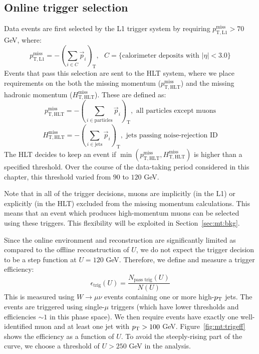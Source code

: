 \subsection{Online trigger selection}
\label{sec:mt:trigger}

Data events are first selected by the L1 trigger system by requiring $p_\mathrm{T,L1}^\mathrm{miss} > 70$ GeV, where:
\begin{equation}
    p_\mathrm{T,L1}^\mathrm{miss} = -\left(\sum_{i\in C} \vec{p}_i \right)_\mathrm{T}, \text{ $C = \{$calorimeter deposits with $|\eta|<3.0\}$}
\end{equation}
Events that pass this selection are sent to the HLT system, where we place requirements on the both the missing momentum ($p_\mathrm{T,HLT}^\mathrm{miss}$) and the missing hadronic momentum ($H_\mathrm{T,HLT}^\mathrm{miss}$).
These are defined as:
\begin{equation}
    p_\mathrm{T,HLT}^\mathrm{miss} = -\left(\sum_{i\in\mathrm{particles}} \vec{p}_i \right)_\mathrm{T}, \text{ all particles except muons}
\end{equation}
\begin{equation}
    H_\mathrm{T,HLT}^\mathrm{miss} = -\left(\sum_{i\in\mathrm{jets}} \vec{p}_i \right)_\mathrm{T}, \text{ jets passing noise-rejection ID}
\end{equation}
The HLT decides to keep an event if $\min(p_\mathrm{T,HLT}^\mathrm{miss}, H_\mathrm{T,HLT}^\mathrm{miss})$ is higher than a specified threshold.
Over the course of the data-taking period considered in this chapter, this threshold varied from $90$ to $120$ GeV.

Note that in all of the trigger decisions, muons are implicitly (in the L1) or explicitly (in the HLT) excluded from the missing momentum calculations.
This means that an event which produces high-momentum muons can be selected using these triggers.
This flexibility will be exploited in Section~\ref{sec:mt:bkg}. 

Since the online environment and reconstruction are significantly limited as compared to the offline reconstruction of $U$, we do not expect the trigger decision to be a step function at $U=120$ GeV.
Therefore, we define and measure a trigger efficiency:
\begin{equation}
    \epsilon_\mathrm{trig} (U) = \frac{N_\text{pass trig}(U)}{N(U)}
\end{equation}
This is measured using $W\rightarrow\mu\nu$ events containing one or more high-$p_\mathrm{T}$ jets.
The events are triggered using single-$\mu$ triggers (which have lower thresholds and efficiencies $\sim 1$ in this phase space).
We then require events have exactly one well-identified muon and at least one jet with $p_\mathrm{T}>100$ GeV.
Figure~\ref{fig:mt:trigeff} shows the efficiency as a function of $U$.
To avoid the steeply-rising part of the curve, we choose a threshold of $U>250$ GeV in the analysis.

